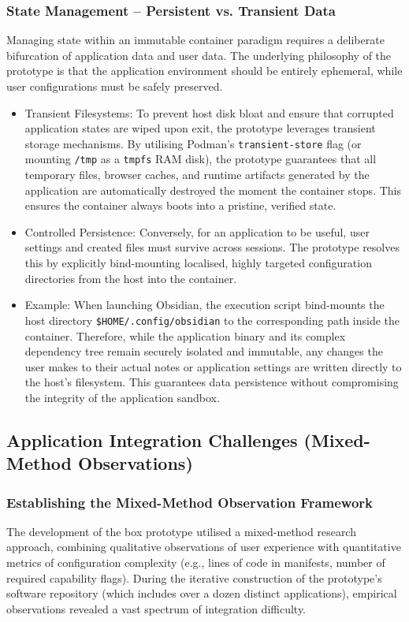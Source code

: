 \documentclass[journal,onecolumn]{IEEEtran}
\newcommand{\code}[1]{\texttt{#1}}
\begin{document}
\subsubsection{State Management – Persistent vs. Transient Data}
Managing state within an immutable container paradigm requires a deliberate bifurcation of application data and user data. The underlying philosophy of the prototype is that the application environment should be entirely ephemeral, while user configurations must be safely preserved.
\begin{itemize}
    \item Transient Filesystems: To prevent host disk bloat and ensure that corrupted application states are wiped upon exit, the prototype leverages transient storage mechanisms. By utilising Podman's \code{transient-store} flag (or mounting \code{/tmp} as a \code{tmpfs} RAM disk), the prototype guarantees that all temporary files, browser caches, and runtime artifacts generated by the application are automatically destroyed the moment the container stops. This ensures the container always boots into a pristine, verified state.
    \item Controlled Persistence: Conversely, for an application to be useful, user settings and created files must survive across sessions. The prototype resolves this by explicitly bind-mounting localised, highly targeted configuration directories from the host into the container.
    \item Example: When launching Obsidian, the execution script bind-mounts the host directory \code{\$HOME/.config/obsidian} to the corresponding path inside the container. Therefore, while the application binary and its complex dependency tree remain securely isolated and immutable, any changes the user makes to their actual notes or application settings are written directly to the host's filesystem. This guarantees data persistence without compromising the integrity of the application sandbox.
\end{itemize}

\subsection{Application Integration Challenges (Mixed-Method Observations)}
\subsubsection{Establishing the Mixed-Method Observation Framework}
The development of the box prototype utilised a mixed-method research approach, combining qualitative observations of user experience with quantitative metrics of configuration complexity (e.g., lines of code in manifests, number of required capability flags). During the iterative construction of the prototype’s software repository (which includes over a dozen distinct applications), empirical observations revealed a vast spectrum of integration difficulty.
\end{document}
